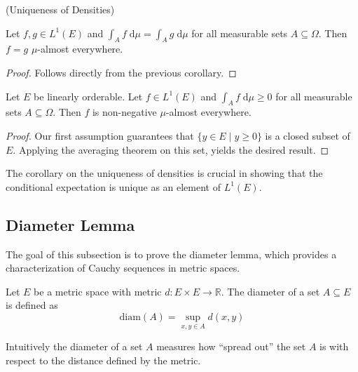 \begin{corollary} (Uniqueness of Densities) \par
	Let $f, g \in L^1(E)$ and $\int_A f \;\textrm{d}\mu = \int_A g \;\textrm{d}\mu$ for all measurable sets $A \subseteq \Omega$. Then $f = g$ $\mu$-almost everywhere. 
\end{corollary}
\begin{proof}
	Follows directly from the previous corollary.
\end{proof}

\begin{corollary}
	Let $E$ be linearly orderable. Let $f \in L^1(E)$ and $\int_A f \;\textrm{d}\mu \ge 0$ for all measurable sets $A \subseteq \Omega$. Then $f$ is non-negative $\mu$-almost everywhere. 
\end{corollary}
\begin{proof}
	Our first assumption guarantees that $\{ y \in E \;\vert\; y \ge 0 \}$ is a closed subset of $E$. Applying the averaging theorem on this set, yields the desired result.
\end{proof}

The corollary on the uniqueness of densities is crucial in showing that the conditional expectation is unique as an element of $L^1(E)$.

\subsection{Diameter Lemma}

The goal of this subsection is to prove the diameter lemma, which provides a characterization of Cauchy sequences in metric spaces.

\begin{definition}
Let $E$ be a metric space with metric $d : E \times E \rightarrow \mathbb{R}$. The diameter of a set $A \subseteq E$ is defined as
\[
	\textrm{diam}(A) = \sup_{x,y \in A} d(x,y)
\]
\end{definition}

Intuitively the diameter of a set $A$ measures how ``spread out'' the set $A$ is with respect to the distance defined by the metric.

